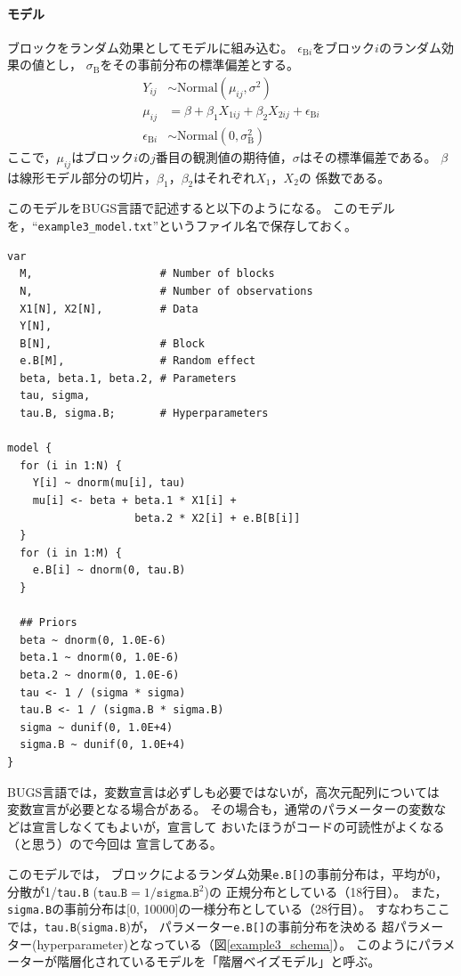 \documentclass[11pt,uplatex]{jsarticle}
\begin{document}
\paragraph{モデル}
ブロックをランダム効果としてモデルに組み込む。
$\epsilon_{\mathrm{B}i}$をブロック$i$のランダム効果の値とし，
$\sigma_\mathrm{B}$をその事前分布の標準偏差とする。
\begin{align*}
Y_{ij} &\sim \mathrm{Normal}(\mu_{ij}, \sigma^{2}) \\
\mu_{ij} &= \beta + \beta_{1} X_{1ij} + \beta_{2} X_{2ij} + \epsilon_{\mathrm{B}i} \\
\epsilon_{\mathrm{B}i} &\sim \mathrm{Normal}(0, \sigma_\mathrm{B}^{2})
\end{align*}
\noindent
ここで，$\mu_{ij}$はブロック$i$の$j$番目の観測値の期待値，$\sigma$はその標準偏差である。
$\beta$は線形モデル部分の切片，$\beta_{1}$，$\beta_{2}$はそれぞれ$X_{1}$，$X_{2}$の
係数である。

このモデルをBUGS言語で記述すると以下のようになる。
このモデルを，``\texttt{example3\_model.txt}''というファイル名で保存しておく。

\begin{lstlisting}
var
  M,                    # Number of blocks
  N,                    # Number of observations
  X1[N], X2[N],         # Data
  Y[N],
  B[N],                 # Block
  e.B[M],               # Random effect
  beta, beta.1, beta.2, # Parameters
  tau, sigma,
  tau.B, sigma.B;       # Hyperparameters

model {
  for (i in 1:N) {
    Y[i] ~ dnorm(mu[i], tau)
    mu[i] <- beta + beta.1 * X1[i] +
                    beta.2 * X2[i] + e.B[B[i]]
  }
  for (i in 1:M) {
    e.B[i] ~ dnorm(0, tau.B)
  }

  ## Priors
  beta ~ dnorm(0, 1.0E-6)
  beta.1 ~ dnorm(0, 1.0E-6)
  beta.2 ~ dnorm(0, 1.0E-6)
  tau <- 1 / (sigma * sigma)
  tau.B <- 1 / (sigma.B * sigma.B)
  sigma ~ dunif(0, 1.0E+4)
  sigma.B ~ dunif(0, 1.0E+4)
}
\end{lstlisting}

BUGS言語では，変数宣言は必ずしも必要ではないが，高次元配列については
変数宣言が必要となる場合がある。
その場合も，通常のパラメーターの変数などは宣言しなくてもよいが，宣言して
おいたほうがコードの可読性がよくなる（と思う）ので今回は
宣言してある。

このモデルでは，
ブロックによるランダム効果\texttt{e.B[]}の事前分布は，平均が0，分散が1/\texttt{tau.B}
($\texttt{tau.B}=1/\texttt{sigma.B}^{2}$)の
正規分布としている（18行目）。
また，\texttt{sigma.B}の事前分布は[0, 10000]の一様分布としている（28行目）。
すなわちここでは，\texttt{tau.B}(\texttt{sigma.B})が，
パラメーター\texttt{e.B[]}の事前分布を決める
超パラメーター(hyperparameter)となっている（図\ref{example3_schema}）。
このようにパラメーターが階層化されているモデルを「階層ベイズモデル」と呼ぶ。
\end{document}

